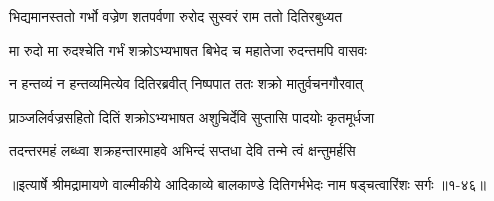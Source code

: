 \twolineshloka
{भिद्यमानस्ततो गर्भो वज्रेण शतपर्वणा}
{रुरोद सुस्वरं राम ततो दितिरबुध्यत} %

\twolineshloka
{मा रुदो मा रुदश्चेति गर्भं शक्रोऽभ्यभाषत}
{बिभेद च महातेजा रुदन्तमपि वासवः} %

\twolineshloka
{न हन्तव्यं न हन्तव्यमित्येव दितिरब्रवीत्}
{निष्पपात ततः शक्रो मातुर्वचनगौरवात्} %

\twolineshloka
{प्राञ्जलिर्वज्रसहितो दितिं शक्रोऽभ्यभाषत}
{अशुचिर्देवि सुप्तासि पादयोः कृतमूर्धजा} %

\twolineshloka
{तदन्तरमहं लब्ध्वा शक्रहन्तारमाहवे}
{अभिन्दं सप्तधा देवि तन्मे त्वं क्षन्तुमर्हसि} %


॥इत्यार्षे श्रीमद्रामायणे वाल्मीकीये आदिकाव्ये बालकाण्डे दितिगर्भभेदः नाम षड्चत्वारिंशः सर्गः ॥१-४६॥
